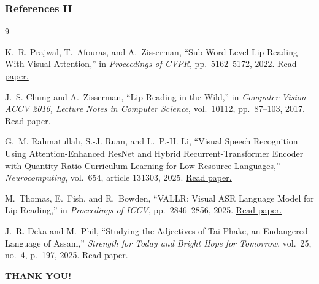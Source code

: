 \documentclass[aspectratio=169, 10pt]{beamer}
\begin{document}
\begin{frame}
\frametitle{References II}

\vspace{-0.25cm}
{\fontsize{8}{10.5}\selectfont
\begin{thebibliography}{9}
  \setcounter{enumiv}{4}

  K.~R. Prajwal, T.~Afouras, and A.~Zisserman,
  ``Sub-Word Level Lip Reading With Visual Attention,''
  in \textit{Proceedings of CVPR}, pp.~5162--5172, 2022.
  \href{https://arxiv.org/abs/2203.02447}{\underline{Read paper.}}

  \vspace{0.08cm}
  J.~S. Chung and A.~Zisserman,
  ``Lip Reading in the Wild,''
  in \textit{Computer Vision -- ACCV 2016, Lecture Notes in Computer Science}, vol.~10112, pp.~87--103, 2017.
  \href{https://www.robots.ox.ac.uk/~vgg/publications/2016/Chung16a/}{\underline{Read paper.}}

  \vspace{0.08cm}
  G.~M. Rahmatullah, S.-J. Ruan, and L.~P.-H. Li,
  ``Visual Speech Recognition Using Attention-Enhanced ResNet and Hybrid Recurrent-Transformer Encoder with Quantity-Ratio Curriculum Learning for Low-Resource Languages,''
  \textit{Neurocomputing}, vol.~654, article 131303, 2025.
  \href{https://doi.org/10.1016/j.neucom.2025.131303}{\underline{Read paper.}}

  \vspace{0.08cm}
  M.~Thomas, E.~Fish, and R.~Bowden,
  ``VALLR: Visual ASR Language Model for Lip Reading,''
  in \textit{Proceedings of ICCV}, pp.~2846--2856, 2025.
  \href{https://openaccess.thecvf.com/content/ICCV2025/html/Thomas_VALLR_Visual_ASR_Language_Model_for_Lip_Reading_ICCV_2025_paper.html}{\underline{Read paper.}}

  \vspace{0.08cm}
  J.~R. Deka and M.~Phil,
  ``Studying the Adjectives of Tai-Phake, an Endangered Language of Assam,''
  \textit{Strength for Today and Bright Hope for Tomorrow}, vol.~25, no.~4, p.~197, 2025.
  \href{http://www.languageinindia.com/}{\underline{Read paper.}}
\end{thebibliography}}
\end{frame}

\begin{frame}
\begin{center}
  \vspace{2.5cm}
  {\fontsize{36}{42}\selectfont\textbf{THANK YOU!}}
\end{center}
\end{frame}
\end{document}

